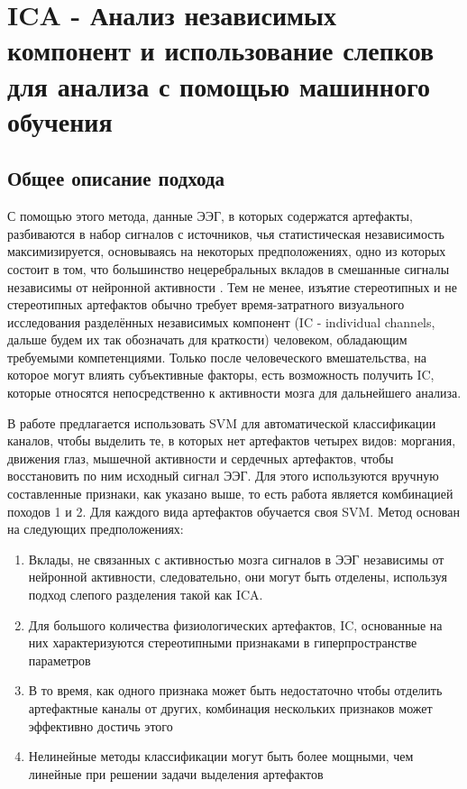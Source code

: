 \documentclass[12pt, a4paper, titlepage]{extreport}
\begin{document}
	\section*{ICA - Анализ независимых компонент и использование слепков для анализа с помощью машинного обучения}
	\subsection*{Общее описание подхода}
	С помощью этого метода, данные ЭЭГ, в которых содержатся артефакты, разбиваются в набор сигналов с источников, чья статистическая независимость максимизируется, основываясь на некоторых предположениях, одно из которых состоит в том, что большинство нецеребральных вкладов в смешанные сигналы независимы от нейронной активности \cite{43}. Тем не менее, изъятие стереотипных и не стереотипных артефактов обычно требует время-затратного визуального исследования разделённых независимых компонент (IC - individual channels, дальше будем их так обозначать для краткости) человеком, обладающим требуемыми компетенциями. Только после человеческого вмешательства, на которое могут влиять субъективные факторы, есть возможность получить IC, которые относятся непосредственно к активности мозга для дальнейшего анализа.
	
	В работе \cite{30} предлагается использовать SVM для автоматической классификации каналов, чтобы выделить те, в которых нет артефактов четырех видов: моргания, движения глаз, мышечной активности и сердечных артефактов, чтобы восстановить по ним исходный сигнал ЭЭГ. Для этого используются вручную составленные признаки, как указано выше, то есть работа является комбинацией походов 1 и 2. Для каждого вида артефактов обучается своя SVM. Метод основан на следующих предположениях:
	\begin{enumerate}
		\item Вклады, не связанных с активностью мозга сигналов в ЭЭГ независимы от нейронной активности, следовательно, они могут быть отделены, используя подход слепого разделения такой как ICA.
		\item Для большого количества физиологических артефактов, IC, основанные на них характеризуются стереотипными признаками в гиперпространстве параметров
		\item В то время, как одного признака может быть недостаточно чтобы отделить артефактные каналы от других, комбинация нескольких признаков может эффективно достичь этого
		\item Нелинейные методы классификации могут быть более мощными, чем линейные при решении задачи выделения артефактов
	\end{enumerate}
\end{document}
